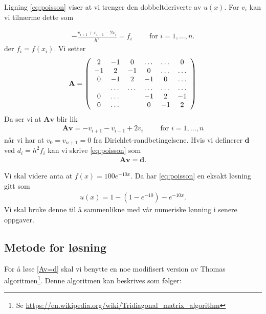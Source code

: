 \documentclass[11pt]{article}
\renewcommand{\vec}{\mathbf} %
\begin{document}
Ligning \eqref{eq:poisson} viser at vi trenger den dobbeltderiverte av
$u(x)$. For $v_i$ kan vi tilnærme dette som 

\begin{align}
  - \frac{ v_{i+1} + v_{i-1} - 2v_i }{ h^2 } =
  f_i\hspace{1cm}\text{for } i = 1,\dots,n.
\end{align}
der $f_i = f(x_i)$. Vi setter 
\begin{align*}
      {\bf A} = \left(\begin{array}{cccccc}
                           2& -1& 0 &\dots   & \dots &0 \\
                           -1 & 2 & -1 &0 &\dots &\dots \\
                           0&-1 &2 & -1 & 0 & \dots \\
                           & \dots   & \dots &\dots   &\dots & \dots \\
                           0&\dots   &  &-1 &2& -1 \\
                           0&\dots    &  & 0  &-1 & 2 \\
                      \end{array} \right)
\end{align*}
Da ser vi at $\vec A \vec v$ blir lik 
\begin{align*}
  \vec A \vec v = -v_{i+1} - v_{i-1} + 2v_i\hspace{1cm}\text{for } i = 1,\dots,n
\end{align*}
når vi har at $v_0 = v_{n+1} = 0$ fra Dirichlet-randbetingelsene. Hvis
vi definerer $\vec d$ ved $d_i = h^2f_i$ kan vi skrive
\eqref{eq:poisson} som 
\begin{align}
  \vec A \vec v = \vec d.\label{Av=d}
\end{align}
 

Vi skal videre anta at $f(x) = 100 e^{-10x}$. Da har
\eqref{eq:poisson} en eksakt løsning gitt som
 \begin{align}
u(x) = 1 -\left(1-e^{-10}\right) - e^{-10x}.\label{eq:exact}
\end{align} 
Vi skal bruke denne til å
sammenlikne med vår numeriske lønning i senere oppgaver.

\subsection{Metode for løsning}
For å løse \eqref{Av=d} skal vi benytte en noe modifisert version av
Thomas algoritmen\footnote{Se
  \url{https://en.wikipedia.org/wiki/Tridiagonal_matrix_algorithm}}. Denne
algoritmen kan beskrives som følger: 
\end{document}
